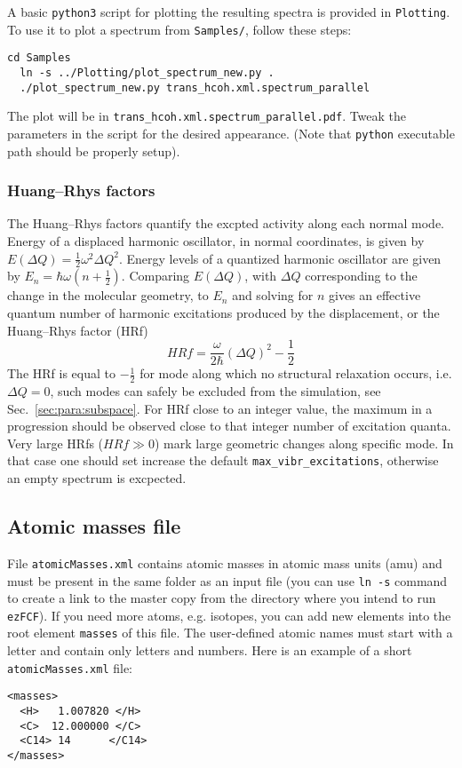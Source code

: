 \documentclass[11pt]{article}
\begin{document}
A basic {\tt python3} script for plotting the resulting spectra is provided in {\tt Plotting}. To use it to plot a spectrum from {\tt Samples/}, follow these steps:
\begin{lstlisting}[frame=single,framerule=0pt]
  cd Samples
  ln -s ../Plotting/plot_spectrum_new.py .
  ./plot_spectrum_new.py trans_hcoh.xml.spectrum_parallel
\end{lstlisting}
The plot will be in {\tt trans\_hcoh.xml.spectrum\_parallel.pdf}. Tweak the parameters in the script for the desired appearance. (Note that {\tt python} executable path should be properly setup). 

\subsubsection{Huang--Rhys factors}
\label{sec:huang_rhys}
The Huang--Rhys factors quantify the excpted activity along each normal mode. Energy of a displaced harmonic oscillator, in normal coordinates, is given by $E(\Delta Q) = \frac{1}{2} \omega^2 \Delta Q^2$. Energy levels of a quantized harmonic oscillator are given by $E _n = \hbar \omega (n + \frac{1}{2})$. Comparing $E (\Delta Q)$, with $\Delta Q$ corresponding to the change in the molecular geometry, to $E _n$ and solving for $n$ gives an effective quantum number of harmonic excitations produced by the displacement, or the Huang--Rhys factor (HRf)
\begin{equation}
    HRf = \frac{\omega}{2 \hbar} \left(\Delta Q \right) ^2 - \frac{1}{2}
\label{eq:hrf}
\end{equation}
The HRf is equal to $-\frac{1}{2}$ for mode along which no structural
relaxation occurs, i.e. $\Delta Q = 0$, such modes can safely be excluded from
the simulation, see Sec.~\ref{sec:para:subspace}. For HRf close to an integer
value, the maximum in a progression should be observed close to that integer
number of excitation quanta. Very large HRfs ($HRf \gg 0$) mark large geometric
changes along specific mode. In that case one should set increase the default
\texttt{max\_vibr\_excitations}, otherwise an empty spectrum is excpected.


\subsection{Atomic masses file}
\label{sec:masses}

File {\tt atomicMasses.xml} contains atomic masses in atomic mass units (amu) and must be present in the same folder 
as an \xml input file (you can use {\tt ln -s} command to create a link to the master copy from the directory
where you intend to run {\tt ezFCF}). 
If you need more atoms, e.g. isotopes, you can add new
elements into the root element {\tt masses} of this file. 
The user-defined atomic names must start with a letter and contain only letters and numbers.
Here is an example of a short {\tt atomicMasses.xml} file:
\begin{lstlisting}[frame=single,framerule=0pt]
<masses>
  <H>   1.007820 </H>
  <C>  12.000000 </C>
  <C14> 14      </C14>
</masses>
\end{lstlisting}
\end{document}
